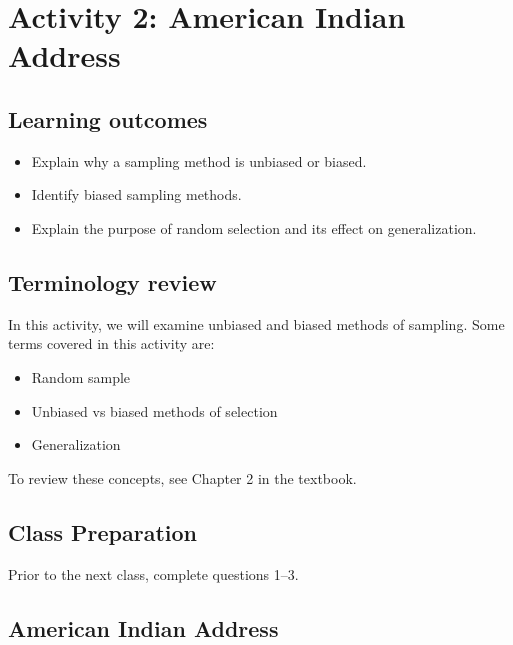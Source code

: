 \documentclass[
]{report}
\begin{document}
\newpage

\section{Activity 2: American Indian Address}\label{activity-2-american-indian-address}


\subsection{Learning outcomes}\label{learning-outcomes-1}

\begin{itemize}
\item
  Explain why a sampling method is unbiased or biased.
\item
  Identify biased sampling methods.
\item
  Explain the purpose of random selection and its effect on generalization.
\end{itemize}

\subsection{Terminology review}\label{terminology-review-1}

In this activity, we will examine unbiased and biased methods of sampling. Some terms covered in this activity are:

\begin{itemize}
\item
  Random sample
\item
  Unbiased vs biased methods of selection
\item
  Generalization
\end{itemize}

To review these concepts, see Chapter 2 in the textbook.

\subsection{Class Preparation}\label{class-preparation}

Prior to the next class, complete questions 1--3.

\subsection{American Indian Address}\label{american-indian-address}
\end{document}
